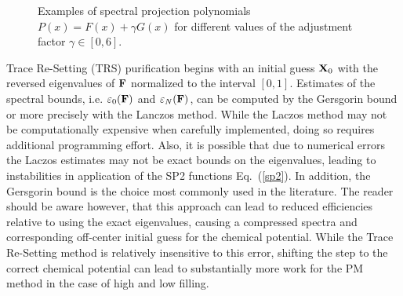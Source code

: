 \commentoutA{\documentclass[prb,aps,twocolumn,twocolumngrid,secnumarabic]{revtex4}}
\begin{document}
\begin{figure}[h]
\caption{Examples of spectral projection polynomials $P(x) = F(x) + \gamma G(x)$
for different values of the adjustment factor $\gamma \in [0,6]$.} \label{Fig_F_G}
\end{figure}

Trace Re-Setting (TRS) purification begins with an initial guess ${\bf X}_0$ 
with the reversed eigenvalues of ${\bf F}$ normalized to the interval $[0,1]$.
Estimates of the spectral bounds,  i.e. $\varepsilon_0({\bf F})$ and $\varepsilon_N({\bf F})$, can be computed 
by the Gersgorin bound\cite{APalser99} or more precisely with the Lanczos method\cite{ADaniels99}.  While the
Laczos method may not be computationally expensive when carefully implemented, doing so requires additional programming effort.
Also, it is possible that due to numerical errors the Laczos estimates may not be exact bounds on
the eigenvalues, leading to instabilities in application of the SP2 functions Eq.~(\ref{sp2}).
In addition, the Gersgorin bound is the choice most commonly used in the literature\cite{APalser99,ADaniels99,DBowler99}.  
The reader should be aware however, that this approach can lead to reduced efficiencies relative to using the exact eigenvalues, 
causing a compressed spectra and corresponding off-center initial guess for the chemical potential.  While the Trace Re-Setting method
is relatively insensitive to this error, shifting the step to the correct chemical potential can lead to substantially 
more work for the PM method in the case of high and low filling.
\end{document}
